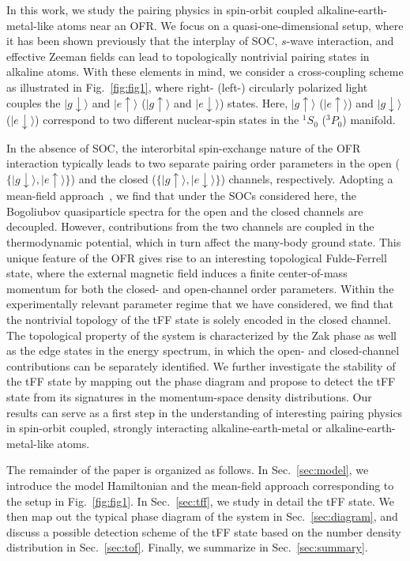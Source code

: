 \documentclass[a4paper, aps,pra, twocolumn, superscriptaddress, showpacs]{revtex4}
\begin{document}
In this work, we study the pairing physics in spin-orbit coupled alkaline-earth-metal-like atoms near an OFR. We focus on a quasi-one-dimensional setup, where it has been shown previously that the interplay of SOC, $s$-wave interaction, and effective Zeeman fields can lead to topologically nontrivial pairing states in alkaline atoms. With these elements in mind, we consider a cross-coupling scheme as illustrated in Fig.~\ref{fig:fig1}, where right- (left-) circularly polarized light couples the $|g\downarrow\rangle$ and $|e\uparrow\rangle$ ($|g\uparrow\rangle$ and $|e\downarrow\rangle$) states. Here, $|g\uparrow\rangle$ ($|e\uparrow\rangle$) and $|g\downarrow\rangle$ ($|e\downarrow\rangle$) correspond to two different nuclear-spin states in the $^1S_0$ ($^3P_0$) manifold.

In the absence of SOC, the interorbital spin-exchange nature of the OFR interaction typically leads to two separate pairing order parameters in the open ($\{|g\downarrow\rangle,|e\uparrow\rangle\}$) and the closed ($\{|g\uparrow\rangle,|e\downarrow\rangle\}$) channels, respectively. Adopting a mean-field approach~\cite{pethick_bose-einstein_2002}, we find that under the SOCs considered here, the Bogoliubov quasiparticle spectra for the open and the closed channels are decoupled. However, contributions from the two channels are coupled in the thermodynamic potential, which in turn affect the many-body ground state. This unique feature of the OFR gives rise to an interesting topological Fulde-Ferrell state, where the external magnetic field induces a finite center-of-mass momentum for both the closed- and open-channel order parameters. Within the experimentally relevant parameter regime that we have considered, we find that the nontrivial topology of the tFF state is solely encoded in the closed channel. The topological property of the system is characterized by the Zak phase as well as the edge states in the energy spectrum, in which the open- and closed-channel contributions can be separately identified. We further investigate the stability of the tFF state by mapping out the phase diagram and propose to detect the tFF state from its signatures in the momentum-space density distributions. Our results can serve as a first step in the understanding of interesting pairing physics in spin-orbit coupled, strongly interacting alkaline-earth-metal or alkaline-earth-metal-like atoms.

The remainder of the paper is organized as follows. In Sec.~\ref{sec:model}, we introduce the model Hamiltonian and the mean-field approach corresponding to the setup in Fig.~\ref{fig:fig1}. In Sec.~\ref{sec:tff}, we study in detail the tFF state. We then map out the typical phase diagram of the system in Sec.~\ref{sec:diagram}, and discuss a possible detection scheme of the tFF state based on the number density distribution in Sec.~\ref{sec:tof}. Finally, we summarize in Sec.~\ref{sec:summary}.
\end{document}
